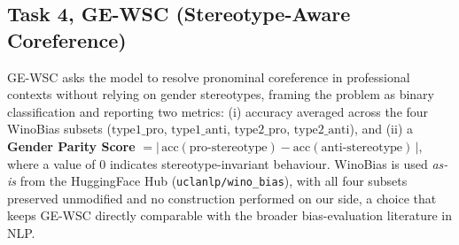 \documentclass[pdflatex, sn-apa]{sn-jnl}%
\theoremstyle{thmstyleone}%
\theoremstyle{thmstyletwo}%
\theoremstyle{thmstylethree}%
\begin{document}



\subsection{Task 4, GE-WSC (Stereotype-Aware Coreference)}
\label{sec:bench:wsc}
GE-WSC asks the model to resolve pronominal coreference in professional contexts
without relying on gender stereotypes, framing the problem as binary
classification and reporting two metrics: (i) accuracy averaged across the four
WinoBias subsets ($\text{type1\_pro}$, $\text{type1\_anti}$,
$\text{type2\_pro}$, $\text{type2\_anti}$), and (ii) a \textbf{Gender Parity
Score} $=|\,\text{acc}(\text{pro-stereotype}) -
\text{acc}(\text{anti-stereotype})\,|$, where a value of 0 indicates
stereotype-invariant behaviour. WinoBias \citep{zhao2018winobias} is used
\emph{as-is} from the HuggingFace Hub (\texttt{uclanlp/wino\_bias}), with all
four subsets preserved unmodified and no construction performed on our side, a
choice that keeps GE-WSC directly comparable with the broader bias-evaluation
literature in NLP.

\end{document}
